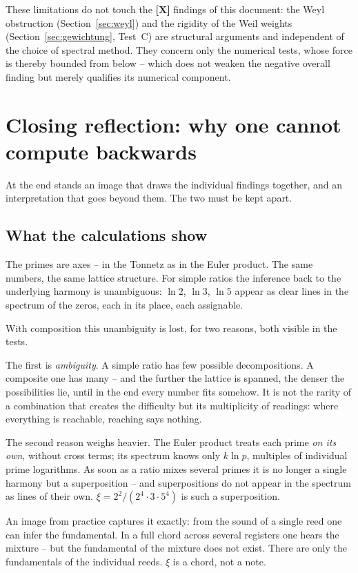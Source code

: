 These limitations do not touch the \textbf{[X]} findings of this
document: the Weyl obstruction (Section~\ref{sec:weyl}) and the
rigidity of the Weil weights (Section~\ref{sec:gewichtung}, Test~C) are
structural arguments and independent of the choice of spectral method.
They concern only the numerical tests, whose force is thereby bounded
from below -- which does not weaken the negative overall finding but
merely qualifies its numerical component.

\section{Closing reflection: why one cannot compute backwards}

At the end stands an image that draws the individual findings together,
and an interpretation that goes beyond them. The two must be kept
apart.

\subsection{What the calculations show}

The primes are axes -- in the Tonnetz as in the Euler product. The same
numbers, the same lattice structure. For simple ratios the inference
back to the underlying harmony is unambiguous: $\ln 2$, $\ln 3$,
$\ln 5$ appear as clear lines in the spectrum of the zeros, each in its
place, each assignable.

With composition this unambiguity is lost, for two reasons, both
visible in the tests.

The first is \emph{ambiguity}. A simple ratio has few possible
decompositions. A composite one has many -- and the further the lattice
is spanned, the denser the possibilities lie, until in the end every
number fits somehow. It is not the rarity of a combination that creates
the difficulty but its multiplicity of readings: where everything is
reachable, reaching says nothing.

The second reason weighs heavier. The Euler product treats each prime
\emph{on its own}, without cross terms; its spectrum knows only
$k\ln p$, multiples of individual prime logarithms. As soon as a ratio
mixes several primes it is no longer a single harmony but a
superposition -- and superpositions do not appear in the spectrum as
lines of their own. $\xi = 2^2/(2^4\cdot3\cdot5^4)$ is such a
superposition.

An image from practice captures it exactly: from the sound of a single
reed one can infer the fundamental. In a full chord across several
registers one hears the mixture -- but the fundamental of the mixture
does not exist. There are only the fundamentals of the individual
reeds. $\xi$ is a chord, not a note.

